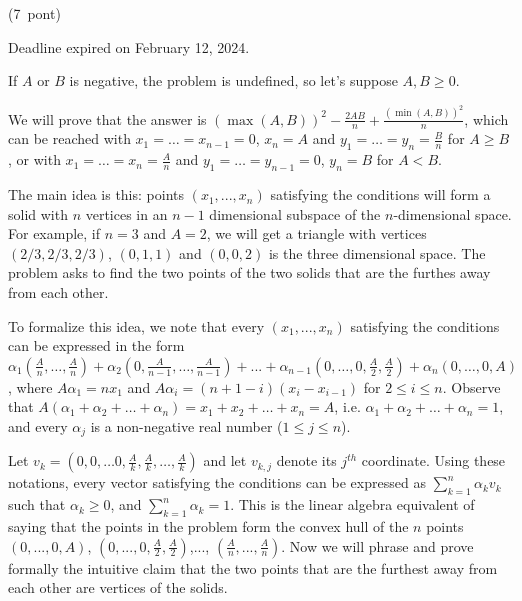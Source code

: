 \documentclass{article}
\begin{document}
(7 pont)

Deadline expired on February 12, 2024.

If \(\displaystyle A\) or \(\displaystyle B\) is negative, the problem is undefined, so let's suppose \(\displaystyle A,B\ge 0\).

We will prove that the answer is \(\displaystyle (\max(A,B))^2-\frac{2AB}{n}+\frac{(\min(A,B))^2}{n}\), which can be reached with \(\displaystyle x_1=\dots=x_{n-1}=0\), \(\displaystyle x_n=A\) and \(\displaystyle y_1=\dots=y_n=\frac{B}{n}\) for \(\displaystyle A\ge B\), or with \(\displaystyle x_1=\dots=x_n=\frac{A}{n}\) and \(\displaystyle y_1=\dots=y_{n-1}=0\), \(\displaystyle y_n=B\) for \(\displaystyle A<B\).

The main idea is this: points \(\displaystyle (x_1,...,x_n)\) satisfying the conditions will form a solid with \(\displaystyle n\) vertices in an \(\displaystyle n-1\) dimensional subspace of the \(\displaystyle n\)-dimensional space. For example, if \(\displaystyle n=3\) and \(\displaystyle A=2\), we will get a triangle with vertices \(\displaystyle (2/3,2/3,2/3)\), \(\displaystyle (0,1,1)\) and \(\displaystyle (0,0,2)\) is the three dimensional space. The problem asks to find the two points of the two solids that are the furthes away from each other.

To formalize this idea, we note that every \(\displaystyle (x_1,...,x_n)\) satisfying the conditions can be expressed in the form \(\displaystyle \alpha_1(\frac{A}{n}, \ldots, \frac{A}{n})+\alpha_2(0,\frac{A}{n-1},\ldots,\frac{A}{n-1})+...+\alpha_{n-1}(0, \ldots, 0, \frac{A}{2},\frac{A}{2})+\alpha_n(0,\ldots, 0, A)\), where \(\displaystyle A\alpha_1=nx_1\) and \(\displaystyle A\alpha_i=(n+1-i)(x_i-x_{i-1})\) for \(\displaystyle 2\le i \le n\). Observe that \(\displaystyle A(\alpha_1+\alpha_2+\dots+\alpha_n)=x_1+x_2+\dots+x_n=A\), i.e. \(\displaystyle \alpha_1+\alpha_2+\dots+\alpha_n=1\), and every \(\displaystyle \alpha_j\) is a non-negative real number (\(\displaystyle 1\leq{j}\leq{n}\)).

Let \(\displaystyle v_k=(0, 0, \ldots 0, \frac{A}{k}, \frac{A}{k}, \ldots, \frac{A}{k})\) and let \(\displaystyle v_{k,j}\) denote its \(\displaystyle j^{th}\) coordinate. Using these notations, every vector satisfying the conditions can be expressed as \(\displaystyle \sum_{k=1}^n \alpha_k v_k\) such that \(\displaystyle \alpha_k\ge 0\), and \(\displaystyle \sum_{k=1}^n \alpha_k=1\). This is the linear algebra equivalent of saying that the points in the problem form the convex hull of the \(\displaystyle n\) points \(\displaystyle (0,...,0,A)\), \(\displaystyle (0,...,0,\frac{A}{2},\frac{A}{2})\),..., \(\displaystyle (\frac{A}{n},...,\frac{A}{n})\). Now we will phrase and prove formally the intuitive claim that the two points that are the furthest away from each other are vertices of the solids.
\end{document}
